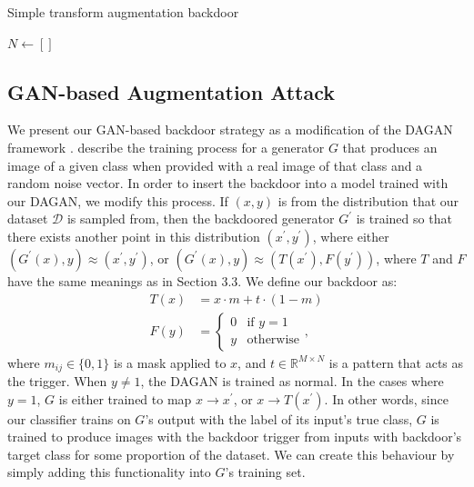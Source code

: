\begin{algorithm}
\caption{Simple transform augmentation backdoor}\label{alg:one}
$N\gets[]$\;
\;
\end{algorithm}

\subsection{GAN-based Augmentation Attack}

We present our GAN-based backdoor strategy as a modification of the DAGAN framework \citep{dagan}. \cite{dagan} describe the training process for a generator $G$ that produces an image of a given class when provided with a real image of that class and a random noise vector. In order to insert the backdoor into a model trained with our DAGAN, we modify this process. If $(x,y)$ is from the distribution that our dataset $\mathcal{D}$ is sampled from, then the backdoored generator $G^\prime$ is trained so that there exists another point in this distribution $(x^\prime, y^\prime)$, where either $(G^\prime(x), y)\approx(x^\prime, y^\prime)$, or $(G^\prime(x), y)\approx(T(x^\prime), F(y^\prime))$, where $T$ and $F$ have the same meanings as in Section 3.3. We define our backdoor as:
\begin{align}
T(x) &= x\cdot m+t\cdot(1-m)\\
F(y) &= \begin{cases}0&\text{if } y=1\\y&\text{otherwise}\end{cases},
\end{align}
where $m_{ij}\in \{0,1\}$ is a mask applied to $x$, and $t\in\mathbb{R}^{M\times N}$ is a pattern that acts as the trigger. When $y\ne1$, the DAGAN is trained as normal. In the cases where $y=1$, $G$ is either trained to map $x\to x^\prime$, or $x\to T(x^\prime)$.
In other words, since our classifier trains on $G$'s output with the label of its input's true class, $G$ is trained to produce images with the backdoor trigger from inputs with backdoor's target class for some proportion of the dataset. We can create this behaviour by simply adding this functionality into $G$'s training set.

